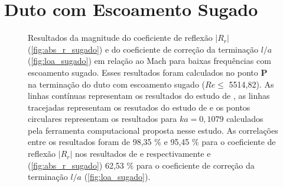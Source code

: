\newpage
\begin{figure}[ht!]
\centering
  
\end{figure}

\newpage
\begin{figure}[ht!]
\centering
  
\end{figure}



\newpage
\section{Duto com Escoamento Sugado}
\begin{figure}[ht!]
\begin{subfigure}{\scaleA \textwidth}
  
\end{subfigure}%
\begin{subfigure}{\scaleA \textwidth}
  
\end{subfigure}
\caption[Resultados de $|R_{r}|$ e $l/a$ em relação ao Mach para baixas frequências com escoamento sugado]{Resultados da magnitude do coeficiente de reflexão $|R_{r}|$ (\ref{fig:abs_r_sugado}) e do coeficiente de correção da terminação $l/a$ (\ref{fig:loa_sugado}) em relação ao Mach para baixas frequências com escoamento sugado. Esses resultados foram calculados no ponto $\textbf{P}$ na terminação do duto com escoamento sugado ($Re \leq$ 5514,82). As linhas contínuas representam os resultados do estudo de , as linhas tracejadas representam os resutados do estudo de  e os pontos circulares representam os resultados para $ka = 0,1079$ calculados pela ferramenta computacional proposta nesse estudo. As correlações entre os resultados foram de 98,35 \% e 95,45 \% para o coeficiente de reflexão $|R_{r}|$ nos resultados de  e  respectivamente e (\ref{fig:abs_r_sugado}) 62,53 \% para o coeficiente de correção da terminação $l/a$ (\ref{fig:loa_sugado}).}
\label{fig:resultados_sugado}
\end{figure}

\newpage
\begin{figure}[ht!]
\centering
  
\end{figure}

\newpage
\begin{figure}[ht!]
\centering
  
\end{figure}

